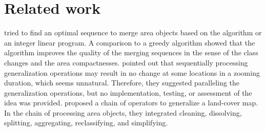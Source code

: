 \documentclass[]{interact}
\begin{document}
\section{Related work}
\label{sec:realted_work}


\citet[]{Peng2019Thesis} tried to 
find an optimal sequence to merge area objects 
based on the \Astar algorithm or an integer linear program.
A comparison to a greedy algorithm showed that 
the \Astar algorithm improves the quality of the merging sequences
in the sense of the class changes and the area compactnesses.
 pointed out that 
sequentially processing generalization operations 
may result in no change at some locations in a zooming duration, 
which seems unnatural.
Therefore, they suggested paralleling the generalization operations,
but no implementation, testing, or assessment of the idea was provided.
\citet{Thiemann2018LandCover} proposed a chain of operators 
to generalize a land-cover map.
In the chain of processing area objects, 
they integrated cleaning, dissolving, splitting, 
aggregating, reclassifying, and simplifying. 
\end{document}
